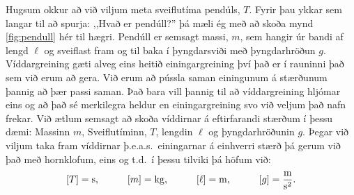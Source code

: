 \ifdefined \wholebook \else\documentclass[oneside]{book}\usepackage{EdlBook}\graphicspath{{figures/}}
\begin{document}
\begin{minipage}{\linewidth}
Hugsum okkur að við viljum meta sveiflutíma pendúls, $T$. Fyrir þau ykkar sem langar til að spurja: ,,Hvað er pendúll?'' þá mæli ég með að skoða mynd \ref{fig:pendull} hér til hægri. Pendúll er semsagt massi, $m$, sem hangir úr bandi af lengd $\ell$ og sveiflast fram og til baka í þyngdarsviði með þyngdarhröðun $g$. Víddargreining gæti alveg eins heitið einingargreining því það er í rauninni það sem við erum að gera. Við erum að 
pússla saman einingunum á stærðunum þannig að þær passi saman. Það bara vill þannig til að víddargreining hljómar eins og að það sé merkilegra heldur en einingargreining svo við veljum það nafn frekar.
Við ætlum semsagt að skoða víddirnar á eftirfarandi stærðum í þessu dæmi: Massinn $m$, Sveiflutíminn, $T$, lengdin $\ell$ og þyngdarhröðunin $g$. Þegar við viljum taka fram víddirnar þ.e.a.s.~einingarnar á einhverri stærð þá gerum við það með hornklofum, eins og t.d.~í þessu tilviki þá höfum við:
\begin{align*}
    \left[ T \right] = \si{s}, \hspace{1cm} \left[ m \right] = \si{kg}, \hspace{1cm} \left[ \ell \right] = \si{m}, \hspace{1cm} \left[ g \right] = \si[per-mode=fraction]{\metre\per\second\squared}.
\end{align*}
\end{minipage}
\end{document}
